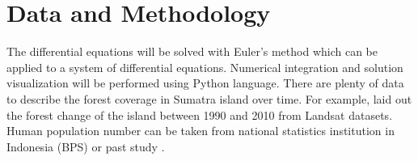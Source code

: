 \documentclass[12pt,a4paper]{article}
\begin{document}
\section{Data and Methodology}
The differential equations will be solved with Euler's method which can be applied to a system of differential equations. Numerical integration and solution visualization will be performed using Python language. There are plenty of data to describe the forest coverage in Sumatra island over time. For example, \cite{bologna2008simple} laid out the forest change of the island between 1990 and 2010 from Landsat datasets. Human population number can be taken from national statistics institution in Indonesia (BPS) or past study \citep{Withington01031982}.



\end{document}
